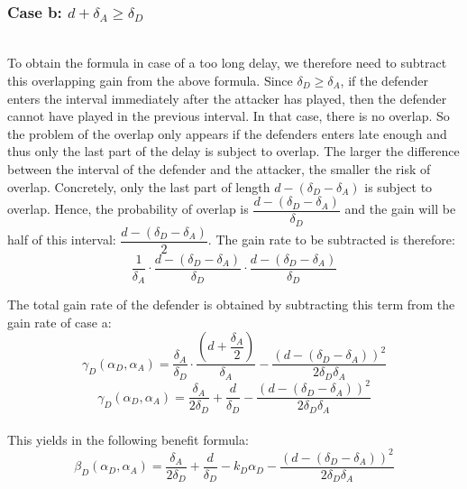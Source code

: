 \documentclass[master=cws, masteroption=vs]{kulemt}
\begin{document}
\begin{abstract*}
~~ \\
\subsubsection*{\textbf{Case b:} $d + \delta_{A} \geq \delta_{D}$}
~~~\\

To obtain the formula in case of a too long delay, we therefore need to subtract this overlapping gain from the above formula. 
Since $\delta_{D} \geq \delta_{A}$, if the defender enters the interval immediately after the attacker has played, then the defender cannot have played in the previous interval. In that case, there is no overlap. So the problem of the overlap only appears if the defenders enters late enough and thus only the last part of the delay is subject to overlap. The larger the difference between the interval of the defender and the attacker, the smaller the risk of overlap. Concretely, only the last part of length $d - (\delta_{D} - \delta_{A})$ is subject to overlap. Hence, the probability of overlap is $\dfrac{ d - (\delta_{D} - \delta_{A})}{\delta_{D}}$ and the gain will be half of this interval:  $\dfrac{ d - (\delta_{D} - \delta_{A})}{2}$.  The gain rate to be subtracted is therefore:\\

\begin{equation}\label{first}
\dfrac{1} {\delta_{A}} \cdot \dfrac{d - (\delta_{D} - \delta_{A})}{\delta_{D}} \cdot \dfrac{d - (\delta_{D} - \delta_{A})}{\delta_{D}}
\end{equation}

The total gain  rate of the defender is obtained by subtracting this term from the gain rate of case a:
 \begin{equation}\label{first}
\gamma_{D}(\alpha_{D},\alpha_{A}) = \dfrac{\delta_{A}}{\delta_{D}} \cdot \dfrac{(d+\dfrac{\delta_{A}}{2})}{\delta_{A}} - \dfrac{(d - (\delta_{D} - \delta_{A}))^{2}}{2 \delta_{D} \delta_{A}}
\end{equation}
\begin{equation}\label{first}
\gamma_{D}(\alpha_{D},\alpha_{A}) = \dfrac{\delta_{A}}{2\delta_{D}} + \dfrac{d}{\delta_{D}} - \dfrac{(d - (\delta_{D} - \delta_{A}))^{2}}{2 \delta_{D} \delta_{A}}
\end{equation}\\
This yields in the following benefit formula:
\begin{equation}\label{first}
\beta_{D}(\alpha_{D},\alpha_{A}) = \dfrac{\delta_{A}}{2\delta_{D}} + \dfrac{d}{\delta_{D}} - k_{D} \alpha_{D} - \dfrac{(d - (\delta_{D} - \delta_{A}))^{2}}{2 \delta_{D} \delta_{A}}
\end{equation}\\
 

\end{abstract*}
\end{document}
